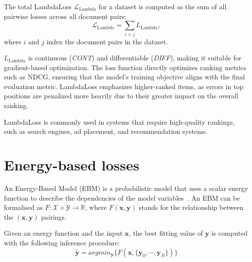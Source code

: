 \documentclass[sn-mathphys-num]{sn-jnl}%
\newcommand \cont{\textit{CONT}}
\newcommand \diff{\textit{DIFF}}
\newcommand{\svec}[1]{\{\ensuremath{\vec{#1}_0, \cdots, \vec{#1}_N}\}}
\renewcommand\vec{\mathbf}
\begin{document}
The total LambdaLoss \( \mathcal{L}_{\text{Lambda}} \) for a dataset is computed as the sum of all pairwise losses across all document pairs:
\begin{equation}
    \mathcal{L}_{\text{Lambda}} = \sum_{i < j} L_{\text{Lambda}},
\end{equation}
where \( i \) and \( j \) index the document pairs in the dataset.

\( L_{\text{Lambda}} \) is continuous (\cont) and differentiable (\diff), making it suitable for gradient-based optimization. The loss function directly optimizes ranking metrics such as NDCG, ensuring that the model's training objective aligns with the final evaluation metric. LambdaLoss emphasizes higher-ranked items, as errors in top positions are penalized more heavily due to their greater impact on the overall ranking.

LambdaLoss is commonly used in systems that require high-quality rankings, such as search engines, ad placement, and recommendation systems.


\color{black}
\section{Energy-based losses}   
\label{sec:ebm}

An Energy-Based Model (EBM) is a probabilistic model that uses a scalar energy function to describe the dependencies of the model variables~\cite{lecun2006tutorial,FRISTON200670,Friston2009,finn2016connection,haarnoja2017reinforcement,grathwohl2019your,Du2019ModelBP}. An EBM can be formalised as ${F}: \mathcal{X} \times \mathcal{Y}\rightarrow \mathbb{R}$, where ${F}(\vec{x},\vec{y})$ stands for the relationship between the $(\vec{x},\vec{y})$ pairings. 

Given an energy function and the input $\vec{x}$, the best fitting value of $\vec{y}$ is computed with the following inference procedure: 
\begin{equation}\label{EMB_def}
    \tilde{\vec{y}} = argmin_{\vec{y}} \{F(\vec{x},\svec{y})\}
\end{equation}


\end{document}
